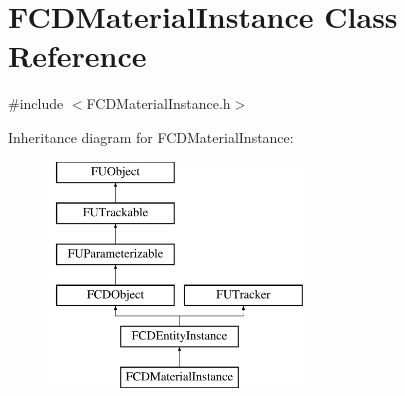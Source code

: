 \hypertarget{classFCDMaterialInstance}{
\section{FCDMaterialInstance Class Reference}
\label{classFCDMaterialInstance}
}


{\ttfamily \#include $<$FCDMaterialInstance.h$>$}

Inheritance diagram for FCDMaterialInstance:\begin{figure}[H]
\begin{center}
\leavevmode
\includegraphics[height=6.000000cm]{classFCDMaterialInstance}
\end{center}
\end{figure}
